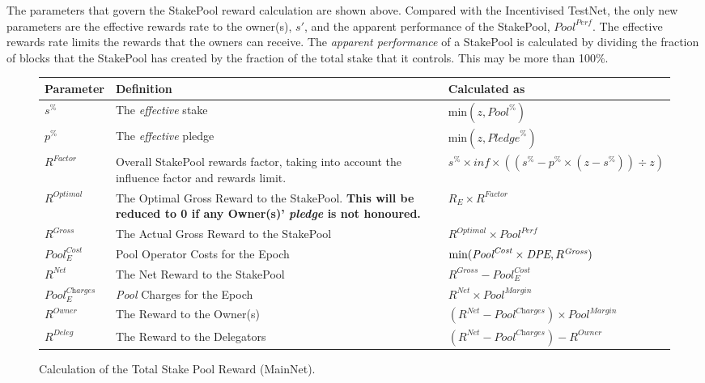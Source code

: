 \documentclass[11pt,a4paper,dvipsnames,twosided,final]{article}
\begin{document}
\noindent
The parameters that govern the StakePool reward calculation are shown above.  Compared with the Incentivised
TestNet, the only new parameters are the effective rewards rate to the owner(s), $s'$, and the apparent performance of the StakePool, $\textit{Pool}^{\textit{Perf}}$.
The effective rewards rate limits the rewards that the owners can receive.  The \emph{apparent performance} of a StakePool is calculated
by dividing the fraction of blocks that the StakePool has created by the fraction of the total stake that it controls.  This may be more than 100\%.

\clearpage
\begin{figure}[h!]
\begin{center}
\begin{tabular}{||l|p{6cm}|l||}
  \hline \hline
  \textbf{Parameter}  & \textbf{Definition} & \textbf{Calculated as} \\\hline
  $s^\%$ & The \emph{effective} stake & $\textrm{min} (z,{\textit{Pool}}^\%)$ \\\hline
  $p^\%$ & The \emph{effective} pledge  & $\textrm{min} (z,{\textit{Pledge}}^\%) $ \\\hline
  $\textit{R}^\textit{Factor}$ & Overall StakePool rewards factor, taking into account the influence factor and rewards limit. & $s^\% \times \textit{inf} \times ((s^\% - p^\% \times (z - s^\%)) \div z)$ \\\hline
  $R^{Optimal}$ & The Optimal Gross Reward to the StakePool.  \textbf{This will be reduced to 0 if any Owner(s)' \emph{pledge} is not honoured.} & $R_E \times \textit{R}^{Factor}$ \\\hline
$R^{\textit{Gross}}$ & The Actual Gross Reward to the StakePool & $R^{Optimal} \times \textit{Pool}^{\textit{Perf}}$ \\\hline
${\textit{Pool}}^{\textit{Cost}}_E$ & Pool Operator Costs for the Epoch & $\textrm{min}(\textit{\textit{Pool}}^{\textit{Cost}} \times \textit{DPE},R^{\textit{Gross}})$ \\\hline
$R^{\textit{Net}}$  & The Net Reward to the StakePool & $R^{\textit{Gross}} - {\textit{Pool}}^{\textit{Cost}}_E$ \\\hline
${\textit{Pool}}^{\textit{Charges}}_E$ & \textit{Pool} Charges for the Epoch & $R^{\textit{Net}} \times \textit{Pool}^{\textit{Margin}}$ \\\hline
$R^{Owner}$ & The Reward to the Owner(s) & $(R^{\textit{Net}}-\textit{Pool}^{\textit{Charges}}) \times {\textit{Pool}}^{\textit{Margin}} $ \\\hline
$R^{Deleg}$ & The Reward to the Delegators & $(R^{\textit{Net}}-\textit{Pool}^{\textit{Charges}}) - R^{Owner}$ \\\hline
\hline
\end{tabular}
\end{center}
\caption{Calculation of the Total Stake Pool Reward (MainNet).}
\end{figure}
\end{document}
